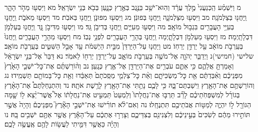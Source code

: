 \documentclass[twoside, openany, parskip=half, 11pt]{book}
\begin{document}
מ וַיִּשְׁמַ֗ע הַֽכְּנַעֲנִי֙ מֶ֣לֶךְ עֲרָ֔ד וְהֽוּא־יֹשֵׁ֥ב בַּנֶּ֖גֶב בְּאֶ֣רֶץ כְּנָ֑עַן בְּבֹ֖א בְּנֵ֥י יִשְׂרָאֵֽל׃ מא וַיִּסְע֖וּ מֵהֹ֣ר הָהָ֑ר וַֽיַּחֲנ֖וּ בְּצַלְמֹנָֽה׃ מב וַיִּסְע֖וּ מִצַּלְמֹנָ֑ה וַֽיַּחֲנ֖וּ בְּפוּנֹֽן׃ מג וַיִּסְע֖וּ מִפּוּנֹ֑ן וַֽיַּחֲנ֖וּ בְּאֹבֹֽת׃ מד וַיִּסְע֖וּ מֵאֹבֹ֑ת וַֽיַּחֲנ֛וּ בְּעִיֵּ֥י הָעֲבָרִ֖ים בִּגְב֥וּל מוֹאָֽב׃ מה וַיִּסְע֖וּ מֵעִיִּ֑ים וַֽיַּחֲנ֖וּ בְּדִיבֹ֥ן גָּֽד׃ מו וַיִּסְע֖וּ מִדִּיבֹ֣ן גָּ֑ד וַֽיַּחֲנ֖וּ בְּעַלְמֹ֥ן דִּבְלָתָֽיְמָה׃ מז וַיִּסְע֖וּ מֵעַלְמֹ֣ן דִּבְלָתָ֑יְמָה וַֽיַּחֲנ֛וּ בְּהָרֵ֥י הָעֲבָרִ֖ים לִפְנֵ֥י נְבֽוֹ׃ מח וַיִּסְע֖וּ מֵהָרֵ֣י הָעֲבָרִ֑ים וַֽיַּחֲנוּ֙ בְּעַֽרְבֹ֣ת מוֹאָ֔ב עַ֖ל יַרְדֵּ֥ן יְרֵחֽוֹ׃ מט וַיַּחֲנ֤וּ עַל־הַיַּרְדֵּן֙ מִבֵּ֣ית הַיְשִׁמֹ֔ת עַ֖ד אָבֵ֣ל הַשִּׁטִּ֑ים בְּעַֽרְבֹ֖ת מוֹאָֽב׃
שלישי (חמישי)נ וַיְדַבֵּ֧ר יְהֹוָ֛ה אֶל־מֹשֶׁ֖ה בְּעַֽרְבֹ֣ת מוֹאָ֑ב עַל־יַרְדֵּ֥ן יְרֵח֖וֹ לֵאמֹֽר׃ נא דַּבֵּר֙ אֶל־בְּנֵ֣י יִשְׂרָאֵ֔ל וְאָמַרְתָּ֖ אֲלֵהֶ֑ם כִּ֥י אַתֶּ֛ם עֹבְרִ֥ים אֶת־הַיַּרְדֵּ֖ן אֶל־אֶ֥רֶץ כְּנָֽעַן׃ נב וְה֨וֹרַשְׁתֶּ֜ם אֶת־כׇּל־יֹשְׁבֵ֤י הָאָ֙רֶץ֙ מִפְּנֵיכֶ֔ם וְאִ֨בַּדְתֶּ֔ם אֵ֖ת כׇּל־מַשְׂכִּיֹּתָ֑ם וְאֵ֨ת כׇּל־צַלְמֵ֤י מַסֵּֽכֹתָם֙ תְּאַבֵּ֔דוּ וְאֵ֥ת כׇּל־בָּמוֹתָ֖ם תַּשְׁמִֽידוּ׃ נג וְהוֹרַשְׁתֶּ֥ם אֶת־הָאָ֖רֶץ וִֽישַׁבְתֶּם־בָּ֑הּ כִּ֥י לָכֶ֛ם נָתַ֥תִּי אֶת־הָאָ֖רֶץ לָרֶ֥שֶׁת אֹתָֽהּ׃ נד וְהִתְנַחַלְתֶּם֩ אֶת־הָאָ֨רֶץ בְּגוֹרָ֜ל לְמִשְׁפְּחֹֽתֵיכֶ֗ם לָרַ֞ב תַּרְבּ֤וּ אֶת־נַחֲלָתוֹ֙ וְלַמְעַט֙ תַּמְעִ֣יט אֶת־נַחֲלָת֔וֹ אֶל֩ אֲשֶׁר־יֵ֨צֵא ל֥וֹ שָׁ֛מָּה הַגּוֹרָ֖ל ל֣וֹ יִהְיֶ֑ה לְמַטּ֥וֹת אֲבֹתֵיכֶ֖ם תִּתְנֶחָֽלוּ׃ נה וְאִם־לֹ֨א תוֹרִ֜ישׁוּ אֶת־יֹשְׁבֵ֣י הָאָ֘רֶץ֮ מִפְּנֵיכֶם֒ וְהָיָה֙ אֲשֶׁ֣ר תּוֹתִ֣ירוּ מֵהֶ֔ם לְשִׂכִּים֙ בְּעֵ֣ינֵיכֶ֔ם וְלִצְנִינִ֖ם בְּצִדֵּיכֶ֑ם וְצָרְר֣וּ אֶתְכֶ֔ם עַל־הָאָ֕רֶץ אֲשֶׁ֥ר אַתֶּ֖ם יֹשְׁבִ֥ים בָּֽהּ׃ נו וְהָיָ֗ה כַּאֲשֶׁ֥ר דִּמִּ֛יתִי לַעֲשׂ֥וֹת לָהֶ֖ם אֶֽעֱשֶׂ֥ה לָכֶֽם׃
\end{document}
